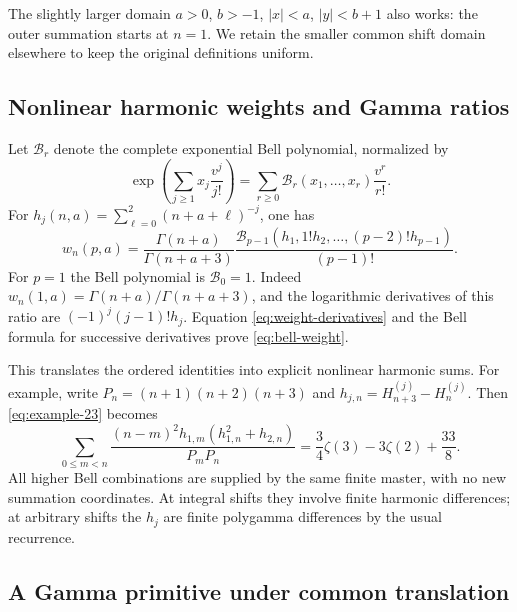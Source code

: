 \documentclass[11pt,a4paper]{article}
\numberwithin{equation}{section}
\theoremstyle{definition}
\theoremstyle{remark}
\newcommand{\Bell}{\mathcal B}
\begin{document}
The slightly larger domain $a>0$, $b>-1$, $|x|<a$, $|y|<b+1$
also works: the outer summation starts at $n=1$. We retain the
smaller common shift domain elsewhere to keep the original definitions
uniform.

\subsection{Nonlinear harmonic weights and Gamma ratios}

Let $\Bell_r$ denote the complete exponential Bell polynomial, normalized by
\begin{equation}\label{eq:bell-definition}
 \exp\left(\sum_{j\ge1}x_j\frac{v^j}{j!}\right)
 =\sum_{r\ge0}\Bell_r(x_1,\ldots,x_r)\frac{v^r}{r!}.
\end{equation}
For $h_j(n,a)=\sum_{\ell=0}^{2}(n+a+\ell)^{-j}$, one has
\begin{equation}\label{eq:bell-weight}
 w_n(p,a)=\frac{\Gamma(n+a)}{\Gamma(n+a+3)}
 \frac{\Bell_{p-1}(h_1,1!h_2,\ldots,(p-2)!h_{p-1})}{(p-1)!}.
\end{equation}
For $p=1$ the Bell polynomial is $\Bell_0=1$.
Indeed $w_n(1,a)=\Gamma(n+a)/\Gamma(n+a+3)$, and the logarithmic
derivatives of this ratio are $(-1)^j(j-1)!h_j$.
Equation \eqref{eq:weight-derivatives} and the Bell formula for
successive derivatives prove \eqref{eq:bell-weight}.

This translates the ordered identities into explicit nonlinear
harmonic sums. For example, write
$P_n=(n+1)(n+2)(n+3)$ and
$h_{j,n}=H_{n+3}^{(j)}-H_n^{(j)}$. Then \eqref{eq:example-23} becomes
\begin{equation}\label{eq:harmonic-example}
 \sum_{0\le m<n}\frac{(n-m)^2h_{1,m}(h_{1,n}^2+h_{2,n})}{P_mP_n}
 =\frac34\zeta(3)-3\zeta(2)+\frac{33}{8}.
\end{equation}
All higher Bell combinations are supplied by the same finite master,
with no new summation coordinates. At integral shifts they involve
finite harmonic differences; at arbitrary shifts the $h_j$ are
finite polygamma differences by the usual recurrence.

\subsection{A Gamma primitive under common translation}
\end{document}

